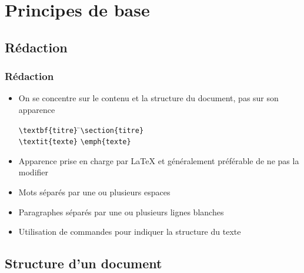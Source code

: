 \section{Principes de base}

\subsection{Rédaction}

\begin{frame}[fragile=singleslide]
  \frametitle{Rédaction}
  \begin{itemize}
  \item On se concentre sur le contenu et la \alert{structure} du
    document, pas sur son \alert{apparence}
      \bigskip
      \begin{tabbing}
        \verb=\textbf{titre}= \qquad\= \faArrowRight \qquad\= \verb|\section{titre}| \\[6pt]
        \verb|\textit{texte}| \> \faArrowRight \> \verb|\emph{texte}|
      \end{tabbing}
      \bigskip
  \item Apparence prise en charge par {\LaTeX} et généralement préférable de ne
    pas la modifier
  \item Mots séparés par une ou plusieurs \alert{espaces}
  \item Paragraphes séparés par une ou plusieurs \alert{lignes blanches}
  \item Utilisation de \alert{commandes} pour indiquer la structure du texte
  \end{itemize}
\end{frame}

\subsection{Structure d'un document}

